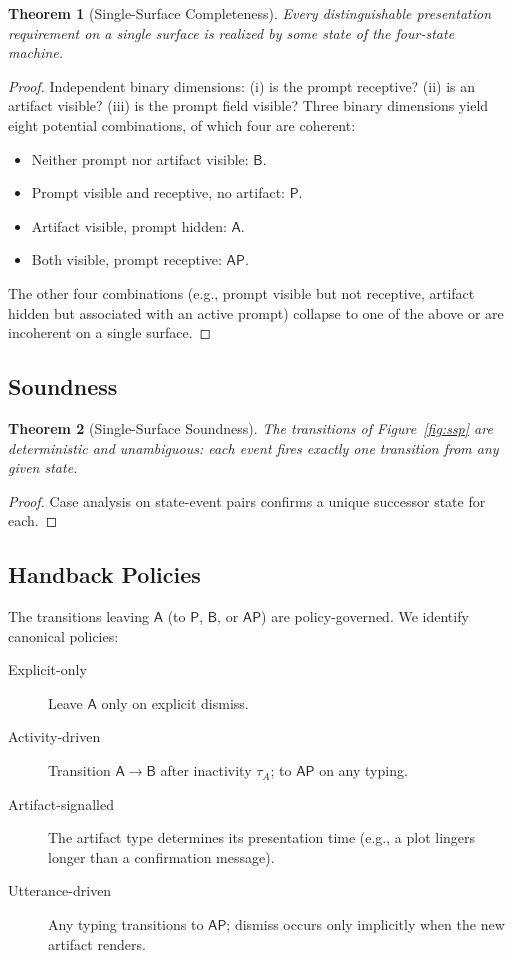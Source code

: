\documentclass[11pt,a4paper]{article}
\newtheorem{theorem}{Theorem}[section]
\theoremstyle{definition}
\theoremstyle{remark}
\begin{document}
\begin{theorem}[Single-Surface Completeness]
\label{thm:sscomplete}
Every distinguishable presentation requirement on a single surface is realized by some state of the four-state machine.
\end{theorem}

\begin{proof}
Independent binary dimensions: (i) is the prompt receptive? (ii) is an artifact visible? (iii) is the prompt field visible? Three binary dimensions yield eight potential combinations, of which four are coherent:
\begin{itemize}
    \item Neither prompt nor artifact visible: $\mathsf{B}$.
    \item Prompt visible and receptive, no artifact: $\mathsf{P}$.
    \item Artifact visible, prompt hidden: $\mathsf{A}$.
    \item Both visible, prompt receptive: $\mathsf{AP}$.
\end{itemize}
The other four combinations (e.g., prompt visible but not receptive, artifact hidden but associated with an active prompt) collapse to one of the above or are incoherent on a single surface.
\end{proof}

\subsection{Soundness}

\begin{theorem}[Single-Surface Soundness]
\label{thm:sssound}
The transitions of Figure~\ref{fig:ssp} are deterministic and unambiguous: each event fires exactly one transition from any given state.
\end{theorem}

\begin{proof}
Case analysis on state-event pairs confirms a unique successor state for each.
\end{proof}

\subsection{Handback Policies}

The transitions leaving $\mathsf{A}$ (to $\mathsf{P}$, $\mathsf{B}$, or $\mathsf{AP}$) are policy-governed. We identify canonical policies:

\begin{description}
    \item[Explicit-only] Leave $\mathsf{A}$ only on explicit dismiss.
    \item[Activity-driven] Transition $\mathsf{A} \to \mathsf{B}$ after inactivity $\tau_A$; to $\mathsf{AP}$ on any typing.
    \item[Artifact-signalled] The artifact type determines its presentation time (e.g., a plot lingers longer than a confirmation message).
    \item[Utterance-driven] Any typing transitions to $\mathsf{AP}$; dismiss occurs only implicitly when the new artifact renders.
\end{description}
\end{document}
